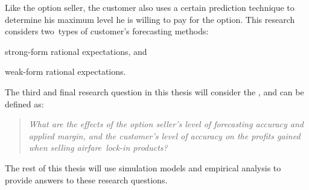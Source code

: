 Like the option seller, the customer also uses a certain prediction technique to determine his maximum level he is willing to pay for the option. This research considers two~types of customer's forecasting methods:
\begin{compactitem}
    \item strong-form rational expectations, and
    \item weak-form rational expectations.
\end{compactitem}

\noindent
The third and final research question in this thesis will consider the , and can be defined as:

\begin{quote}\emph{What are the effects of the option seller's level of forecasting accuracy and applied margin, and the customer's level of accuracy on the profits gained when selling airfare~lock-in products?}\end{quote}

The rest of this thesis will use simulation models and empirical analysis to provide answers to these research questions.